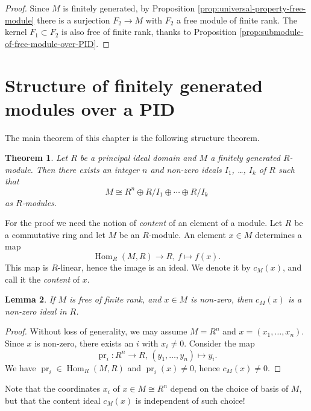 \documentclass[11pt]{amsbook}
\DeclareMathOperator\Hom{Hom}
\DeclareMathOperator\pr{pr}
\theoremstyle{plain}
\newtheorem{theorem}{Theorem}
\newtheorem{lemma}[theorem]{Lemma}
\theoremstyle{definition}
\begin{document}
\begin{proof}
Since $M$ is finitely generated, by Proposition \ref{prop:universal-property-free-module} there is a surjection $F_2 \to M$ with $F_2$ a free module of finite rank. The kernel $F_1\subset F_2$ is also free of finite rank, thanks to Proposition \ref{prop:submodule-of-free-module-over-PID}.
\end{proof}


\section{Structure of finitely generated modules over a PID}

The main theorem of this chapter is the following structure theorem.

\begin{theorem}\label{thm:structure-fg-mod-over-PID}
Let $R$ be a principal ideal domain and $M$  a finitely generated $R$-module. Then there exists an integer $n$ and non-zero ideals $I_1$,  \ldots,  $I_k$ of $R$ such that
\[
	M \cong R^n \oplus R/I_1 \oplus \cdots \oplus R/I_k
\]
as $R$-modules.
\end{theorem}

For the proof we need the notion of \emph{content} of an element of a module.
Let $R$ be a commutative ring and let $M$ be an $R$-module. An element $x\in M$ determines a map
\begin{equation}\label{eq:content-evaluation}
	\Hom_R(M,R) \to R,\,f \mapsto f(x).
\end{equation}
This map is $R$-linear, hence the image is an ideal. We denote it by $c_M(x)$, and call it the \emph{content} of $x$.

\begin{lemma}\label{lemma:non-zero-content}
If $M$ is free of finite rank, and $x\in M$ is non-zero, then $c_M(x)$ is a non-zero ideal in $R$.
\end{lemma}

\begin{proof}
Without loss of generality, we may assume $M=R^n$ and $x=(x_1,\ldots, x_n)$. Since $x$ is non-zero, there exists an $i$ with $x_i\neq 0$. Consider the map
\[
	\pr_i \colon R^n \to R,\, (y_1,\ldots, y_n) \mapsto y_i.
\]
We have $\pr_i\in \Hom_R(M,R)$ and $\pr_i(x)\neq 0$, hence $c_M(x)\neq 0$.
\end{proof}

Note that the coordinates $x_i$ of $x\in M \cong R^n$ depend on the choice of basis of $M$, but that the content ideal $c_M(x)$ is independent of such choice!
\end{document}
